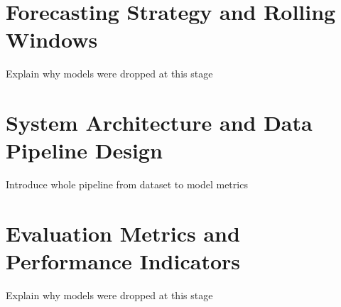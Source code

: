
\section{Forecasting Strategy and Rolling Windows}
\label{sec:forecastStrategy}

Explain why models were dropped at this stage


\section{System Architecture and Data Pipeline Design}
\label{sec:computationalPipeline}

Introduce whole pipeline from dataset to model metrics



\section{Evaluation Metrics and Performance Indicators}
\label{sec:evaluationMetrics}

Explain why models were dropped at this stage